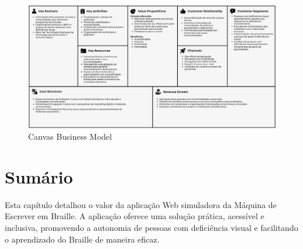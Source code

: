 \begin{figure}[h]
    \centering
    \includegraphics[scale=0.3]{ch03/assets/canva-business-model.png}
    \decoRule
    \caption[Canvas Business Model]{Canvas Business Model}
    \label{fig:ch02-canva-business-model}
\end{figure}

\section{Sumário}

Esta capítulo detalhou o valor da aplicação Web simuladora da Máquina de Escrever em Braille. A aplicação oferece uma solução prática, acessível e inclusiva, promovendo a autonomia de pessoas com deficiência visual e facilitando o aprendizado do Braille de maneira eficaz.


